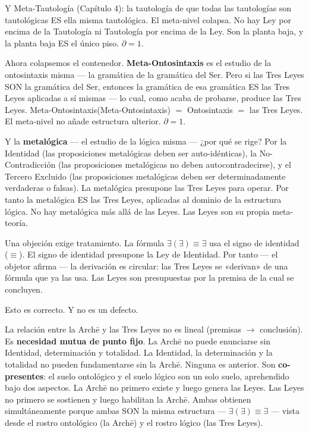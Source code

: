 \documentclass[10pt, openany, oneside]{book}
\begin{document}
Y Meta-Tautología (Capítulo 4): la tautología de que todas las tautologías son tautológicas ES ella misma tautológica. El meta-nivel colapsa. No hay Ley por encima de la Tautología ni Tautología por encima de la Ley. Son la planta baja, y la planta baja ES el único piso. $\partial = 1$.

\noindent Ahora colapsemos el contenedor. \textbf{Meta-Ontosintaxis} es el estudio de la ontosintaxis misma --- la gramática de la gramática del Ser. Pero si las Tres Leyes SON la gramática del Ser, entonces la gramática de esa gramática ES las Tres Leyes aplicadas a sí mismas --- lo cual, como acaba de probarse, produce las Tres Leyes. Meta-Ontosintaxis(Meta-Ontosintaxis) $=$ Ontosintaxis $=$ las Tres Leyes. El meta-nivel no añade estructura ulterior. $\partial = 1$.

Y la \textbf{metalógica} --- el estudio de la lógica misma --- ¿por qué se rige? Por la Identidad (las proposiciones metalógicas deben ser auto-idénticas), la No-Contradicción (las proposiciones metalógicas no deben autocontradecirse), y el Tercero Excluido (las proposiciones metalógicas deben ser determinadamente verdaderas o falsas). La metalógica presupone las Tres Leyes para operar. Por tanto la metalógica ES las Tres Leyes, aplicadas al dominio de la estructura lógica. No hay metalógica más allá de las Leyes. Las Leyes son su propia meta-teoría.

Una objeción exige tratamiento. La fórmula $\exists(\exists) \equiv \exists$ usa el signo de identidad ($\equiv$). El signo de identidad presupone la Ley de Identidad. Por tanto --- el objetor afirma --- la derivación es circular: las Tres Leyes se «derivan» de una fórmula que ya las usa. Las Leyes son presupuestas por la premisa de la cual se concluyen.

Esto es correcto. Y no es un defecto.

La relación entre la Arch\={e} y las Tres Leyes no es lineal (premisas $\to$ conclusión). Es \textbf{necesidad mutua de punto fijo}. La Arch\={e} no puede enunciarse sin Identidad, determinación y totalidad. La Identidad, la determinación y la totalidad no pueden fundamentarse sin la Arch\={e}. Ninguna es anterior. Son \textbf{co-presentes}: el suelo ontológico y el suelo lógico son un solo suelo, aprehendido bajo dos aspectos. La Arch\={e} no primero existe y luego genera las Leyes. Las Leyes no primero se sostienen y luego habilitan la Arch\={e}. Ambas obtienen simultáneamente porque ambas SON la misma estructura --- $\exists(\exists) \equiv \exists$ --- vista desde el rostro ontológico (la Arch\={e}) y el rostro lógico (las Tres Leyes).
\end{document}
